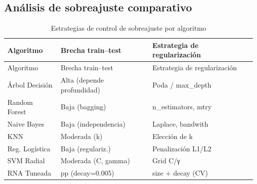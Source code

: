 \documentclass[
]{article}
\begin{document}
\subsection{Análisis de sobreajuste
comparativo}\label{anuxe1lisis-de-sobreajuste-comparativo}

\begin{longtable}[]{@{}
  >{\raggedright\arraybackslash}p{}
  >{\raggedright\arraybackslash}p{}
  >{\raggedright\arraybackslash}p{}@{}}
\caption{Estrategias de control de sobreajuste por
algoritmo}\tabularnewline
\toprule\noalign{}
\begin{minipage}[b]{\linewidth}\raggedright
Algoritmo
\end{minipage} & \begin{minipage}[b]{\linewidth}\raggedright
Brecha train--test
\end{minipage} & \begin{minipage}[b]{\linewidth}\raggedright
Estrategia de regularización
\end{minipage} \\
\midrule\noalign{}
\endfirsthead
\toprule\noalign{}
\begin{minipage}[b]{\linewidth}\raggedright
Algoritmo
\end{minipage} & \begin{minipage}[b]{\linewidth}\raggedright
Brecha train--test
\end{minipage} & \begin{minipage}[b]{\linewidth}\raggedright
Estrategia de regularización
\end{minipage} \\
\midrule\noalign{}
\endhead
\bottomrule\noalign{}
\endlastfoot
Árbol Decisión & Alta (depende profundidad) & Poda / max\_depth \\
Random Forest & Baja (bagging) & n\_estimators, mtry \\
Naive Bayes & Baja (independencia) & Laplace, bandwith \\
KNN & Moderada (k) & Elección de k \\
Reg. Logística & Baja (regulariz.) & Penalización L1/L2 \\
SVM Radial & Moderada (C, gamma) & Grid C/γ \\
RNA Tuneada & -0.292 pp (decay=0.005) & size + decay (CV) \\
\end{longtable}
\end{document}
